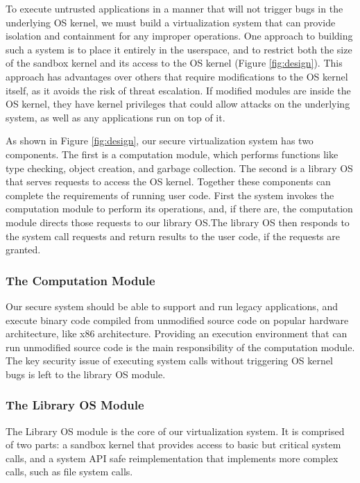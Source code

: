 {To execute untrusted applications in a manner that will not trigger bugs
in the underlying OS kernel, %
we must build a virtualization system that can provide isolation and
containment for any improper operations.
One approach to building such a system is to place it entirely in the userspace,
and to restrict both the size of the sandbox kernel and its access to the
OS kernel (Figure \ref{fig:design}).
This approach has advantages over others that require modifications to
the OS kernel itself, as it avoids the risk of threat escalation. If modified modules
are inside the OS kernel, they have kernel privileges that could allow attacks
on the underlying system, as well as any applications run on top of it.

As shown in Figure \ref{fig:design}, our secure virtualization system
has two components.
The first is a computation module, which performs functions like type checking,
object creation, and garbage collection. The second is a library OS that
serves requests to access the OS kernel.
Together these components can complete the requirements of running user code.
First the system invokes the computation module to perform its operations,
and, if there are, the computation module directs those requests to our
library OS.The library OS then responds to the system call requests and
return results to the user code, if the requests are granted.

\subsubsection{The Computation Module}

Our secure system should be able to support and run legacy applications,
and execute binary code compiled from unmodified source code on popular hardware architecture,
like x86 architecture. Providing an execution environment that can run unmodified source code is
the main responsibility of the computation module. The key security issue of executing system calls
without triggering OS kernel bugs is left to the library OS module.

\subsubsection{The Library OS Module}

The Library OS module is the core of our virtualization system. It is comprised
of two parts: a sandbox kernel that provides access to basic but critical
system calls, and a system API safe reimplementation that implements more
complex calls, such as file system calls.

}
